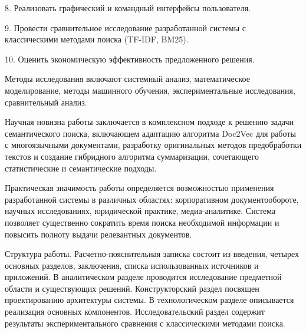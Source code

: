 	8. Реализовать графический и командный интерфейсы пользователя.
	
	9. Провести сравнительное исследование разработанной системы с классическими методами поиска (TF-IDF, BM25).
	
	10. Оценить экономическую эффективность предложенного решения.
	
	Методы исследования включают системный анализ, математическое моделирование, методы машинного обучения, экспериментальные исследования, сравнительный анализ.
	
	Научная новизна работы заключается в комплексном подходе к решению задачи семантического поиска, включающем адаптацию алгоритма Doc2Vec для работы с многоязычными документами, разработку оригинальных методов предобработки текстов и создание гибридного алгоритма суммаризации, сочетающего статистические и семантические подходы.
	
	Практическая значимость работы определяется возможностью применения разработанной системы в различных областях: корпоративном документообороте, научных исследованиях, юридической практике, медиа-аналитике. Система позволяет существенно сократить время поиска необходимой информации и повысить полноту выдачи релевантных документов.
	
	Структура работы. Расчетно-пояснительная записка состоит из введения, четырех основных разделов, заключения, списка использованных источников и приложений. В аналитическом разделе проводится исследование предметной области и существующих решений. Конструкторский раздел посвящен проектированию архитектуры системы. В технологическом разделе описывается реализация основных компонентов. Исследовательский раздел содержит результаты экспериментального сравнения с классическими методами поиска.
	
\clearpage